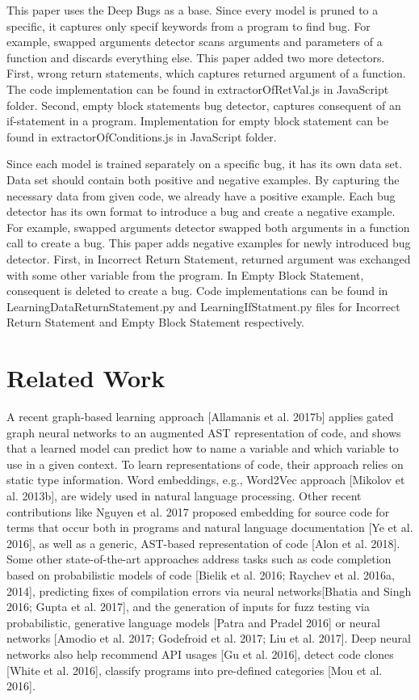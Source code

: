 \documentclass[sigconf]{acmart}
\begin{document}
This paper uses the Deep Bugs as a base. Since every model is pruned to a specific, it captures only specif keywords from a program to find bug. For example, swapped arguments detector scans  arguments and parameters of a function and discards everything else. This paper added two more detectors. First, wrong return statements, which captures returned argument of a function. The code implementation can be found in extractorOfRetVal.js in JavaScript folder. Second, empty block statements bug detector, captures consequent of an if-statement in a program. Implementation for empty block statement can be found in extractorOfConditions.js in JavaScript folder. 

 Since each model is trained separately on a specific bug, it has its own data set. Data set should contain both positive and negative examples. By capturing the necessary data from given code, we already have a positive example. Each bug detector has its own format to introduce a bug and create a negative example. For example, swapped arguments detector swapped both arguments in a function call to create a bug. This paper adds negative examples for newly introduced bug detector. First, in Incorrect Return Statement, returned argument was exchanged with some other variable from the program. In Empty Block Statement, consequent is deleted to create a bug. Code implementations can be found in LearningDataReturnStatement.py and LearningIfStatment.py files for Incorrect Return Statement and Empty Block Statement respectively. 


\section{Related Work}
A recent graph-based learning approach \cite{allamanis}[Allamanis et al. 2017b] applies gated graph neural networks to an augmented AST representation of code, and shows that a learned model can predict
how to name a variable and which variable to use in a given context. To learn representations of code, their approach relies on static type information. Word embeddings, e.g., Word2Vec approach \cite{mikolov}[Mikolov et al. 2013b], are widely used in natural language processing. Other recent contributions like Nguyen et al.\cite{nguyen17} 2017 proposed embedding for source code for terms that occur both in programs and natural language documentation\cite{ye2016} [Ye et al. 2016], as well as a generic,
AST-based representation of code [Alon et al. 2018]\cite{alon18}.
Some other state-of-the-art approaches address tasks such as code completion based on probabilistic models of code [Bielik et al. 2016; Raychev et al. 2016a, 2014]\cite{bielik16}, predicting fixes of compilation errors via neural networks\cite{bhatia16}\cite{gupta16}[Bhatia and Singh 2016; Gupta et al. 2017], and the generation of inputs for fuzz testing via probabilistic, generative language models\cite{patra16} [Patra and Pradel 2016] or neural networks\cite{amodio17} [Amodio et al. 2017; Godefroid et al. 2017;\cite{liu17}
Liu et al. 2017]. Deep neural networks also help recommend API usages [Gu et al. 2016]\cite{gu16}, detect code clones \cite{white16}[White et al. 2016], classify programs into pre-defined categories [Mou et al. 2016]\cite{mou16}.
\end{document}
